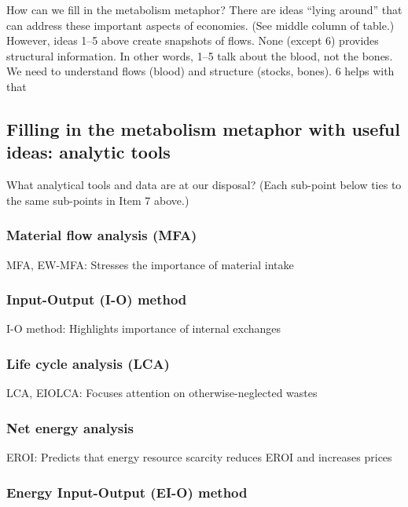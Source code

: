 How can we fill in the metabolism metaphor? There are ideas “lying around” that can address these important aspects of economies. (See middle column of table.) However, ideas 1–5 above create snapshots of flows. None (except 6) provides structural information. In other words, 1–5 talk about the blood, not the bones. We need to understand flows (blood) and structure (stocks, bones). 6 helps with that

\subsection{Filling in the metabolism metaphor with useful ideas: analytic tools}
\label{sec:analytic_tools}

What analytical tools and data are at our disposal?
(Each sub-point below ties to the same sub-points in Item 7 above.)

\subsubsection{Material flow analysis (MFA)}
\label{sec:MFA}

MFA, EW-MFA: Stresses the importance of material intake

\subsubsection{Input-Output (I-O) method}
\label{sec:I-O}

I-O method: Highlights importance of internal exchanges

\subsubsection{Life cycle analysis (LCA)}
\label{sec:LCA}

LCA, EIOLCA: Focuses attention on otherwise-neglected wastes

\subsubsection{Net energy analysis}
\label{sec:NEA}

EROI: Predicts that energy resource scarcity reduces EROI and increases prices

\subsubsection{Energy Input-Output (EI-O) method}
\label{sec:EI-O}

